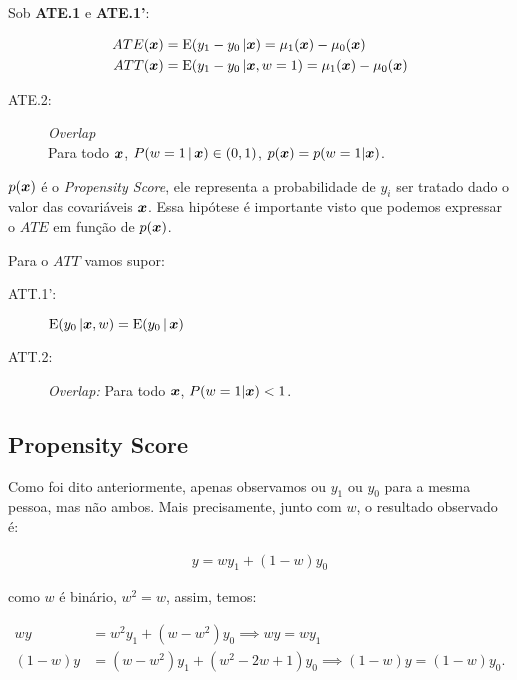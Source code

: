 \documentclass[11pt, oneside, a4paper, article]{article}
\numberwithin{equation}{section}
\begin{document}
\begin{description}
Sob \textbf{ATE.1} e \textbf{ATE.1'}:

\vspace{-1 em}
\begin{align*}
	ATE( \boldsymbol{x} ) &= \text{E}( y_{1} - y_{0} \, | \boldsymbol{x} ) = \mu_{1}(\boldsymbol{x}) - \mu_{0}(\boldsymbol{x}) 
	\\
	ATT( \boldsymbol{x} ) &= \text{E}( y_{1} - y_{0} \, | \boldsymbol{x}, w=1 ) = \mu_{1}(\boldsymbol{x}) - \mu_{0}(\boldsymbol{x}) 
\end{align*}

\begin{description}
	\item[ATE.2:] \textit{Overlap} \\
		Para todo $\boldsymbol{x}$, $P(w=1 \, | \, \boldsymbol{x} ) \in ( 0, 1 )$, 
		$p(\boldsymbol{x}) = p(w=1 | \boldsymbol{x})$.
\end{description}

$p(\boldsymbol{x})$ é o \textit{Propensity Score}, ele representa a probabilidade de $y_{i}$ ser tratado dado o valor das covariáveis $\boldsymbol{x}$.
Essa hipótese é importante visto que podemos expressar o $ATE$ em função de $p(\boldsymbol{x})$.

\vspace{1 em}
Para o $ATT$ vamos supor:

\begin{description}
	\item[ATT.1':] 
		$\text{E}( y_{0} \, | \boldsymbol{x}, w ) = \text{E}( y_{0} \, | \, \boldsymbol{x} )$

	\item[ATT.2:] \textit{Overlap:} Para todo $\boldsymbol{x}$, $P(w=1 | \boldsymbol{x} ) < 1$.
\end{description}

\subsection{Propensity Score}

Como foi dito anteriormente, apenas observamos ou $y_{1}$ ou $y_{0}$ para a mesma pessoa, mas não ambos.
Mais precisamente, junto com $w$, o resultado observado é:

\vspace{-1 em}
\begin{align*}
	y = wy_{1} + (1 - w) y_{0}
\end{align*}

\noindent
como  $w$ é binário, $w^2 = w$, assim, temos:

\vspace{-1 em}
\begin{align*}
	w y &= w^{2} y_{1} + (w - w^{2}) y_{0}
	\implies
	\boxed{w y = w y_{1} }
	\\
	( 1 - w ) y &= (w - w^{2}) y_{1} + ( w^{2} - 2w + 1 ) y_{0}
	\implies
	\boxed{( 1 - w ) y = (1 - w) y_{0}}.
\end{align*}


\end{description}
\end{document}
